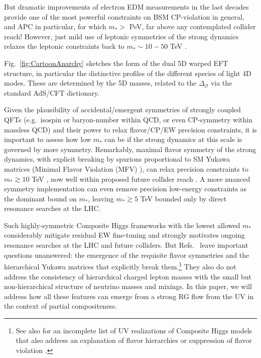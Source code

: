 \documentclass[aps,prl,twocolumn,showpacs,10pt,preprintnumbers,nofootinbib]{revtex4-2}
\newcommand{\op}{\mathcal{O}}
\begin{document}
But dramatic improvements of electron EDM measurements in the last decades provide one of the most powerful constraints on BSM CP-violation in general, and APC in particular, for which $m_* >$ PeV, far above any contemplated collider reach! However, just mild use of leptonic symmetries of the strong dynamics relaxes the leptonic constraints back to $m_* \sim 10 - 50$ TeV \cite{Frigerio:2018uwx}. 

Fig.~\ref{fig:CartoonAnarchy} sketches the form of the dual 5D warped EFT structure, in particular the distinctive profiles of the different species of light 4D modes. These are determined by the 5D masses, related to the $\Delta_{\op}$ via the standard AdS/CFT dictionary. 

Given the plausibility of accidental/emergent symmetries of strongly coupled QFTs (e.g.~isospin or baryon-number within QCD, or even CP-symmetry within massless QCD) and their power to relax flavor/CP/EW precision constraints, it is important to assess how low $m_*$ can be if the strong dynamics at this scale is governed by more symmetry. 
Remarkably, maximal flavor symmetry of the strong dynamics, with explicit breaking by spurions proportional to SM Yukawa matrices \cite{Chivukula:1987py,Redi:2011zi, Barbieri:2012tu, Redi:2013pga} (Minimal Flavor Violation (MFV) \cite{DAmbrosio:2002vsn}), can relax precision constraints to $m_* \gtrsim 10$ TeV \cite{Glioti:2024hye}, now well within proposed future collider reach \cite{Golling:2016gvc,Chen:2022msz,Accettura:2023ked,Stefanek:2024kds}. A more nuanced symmetry implementation \cite{Redi:2012uj, Barbieri:2012uh,Glioti:2024hye} can even remove precision low-energy constraints as the dominant bound on $m_*$, leaving $m_* \gtrsim 5$ TeV bounded only by direct resonance searches at the LHC.

Such highly-symmetric Composite Higgs frameworks with the lowest allowed $m_*$ considerably mitigate residual EW fine-tuning and strongly motivates ongoing resonance searches at the LHC and future colliders. But Refs.~\cite{Redi:2011zi, Barbieri:2012tu, Redi:2013pga,Redi:2012uj,Glioti:2024hye,Barbieri:2012uh} leave important questions unanswered: the emergence of the requisite flavor symmetries and the 
hierarchical Yukawa matrices that explicitly break them.\footnote{See also \cite{Fitzpatrick:2007sa,Panico:2016ull,Fuentes-Martin:2022xnb,Covone:2024elw} for an incomplete list of UV realizations of Composite Higgs models that also address an explanation of flavor hierarchies or suppression of flavor violation \cite{Cheung:2007bu,Cacciapaglia:2007fw,Csaki:2008eh,Csaki:2009bb}.}  They also do not address the consistency of hierarchical charged lepton masses with the small but non-hierarchical structure of neutrino masses and mixings. In this paper, we will address how all these features can emerge from a strong RG flow from the UV in the context of partial compositeness. 
\end{document}
